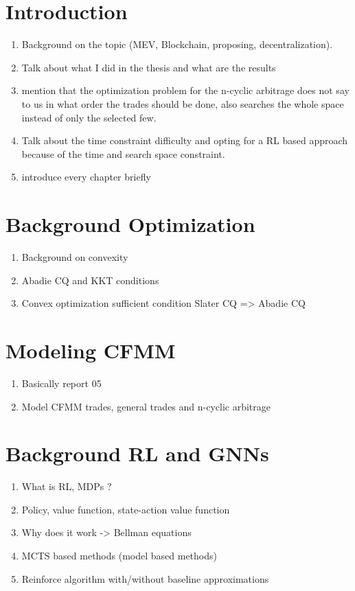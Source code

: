 


\maketitle

\tableofcontents
\section{Introduction}
\begin{enumerate}
    \item  Background on the topic (MEV, Blockchain, proposing, decentralization).
    \item Talk about what I did in the thesis and what are the results
    \item mention that the optimization problem for the n-cyclic arbitrage
        does not say to us in what order the trades should be done, also
        searches the whole space instead of only the selected few.
    \item Talk about the time constraint difficulty and opting for a RL based
        approach because of the time and search space constraint.
    \item introduce every chapter briefly
\end{enumerate}

\section{Background Optimization}
\begin{enumerate}
    \item Background on convexity
    \item Abadie CQ and KKT conditions
    \item Convex optimization sufficient condition Slater CQ => Abadie CQ
\end{enumerate}

\section{Modeling CFMM}
\begin{enumerate}
    \item Basically report 05
    \item Model CFMM trades, general trades and n-cyclic arbitrage
\end{enumerate}

\section{Background RL and GNNs}
\begin{enumerate}
    \item What is RL, MDPs ?
    \item Policy, value function, state-action value function
    \item Why does it work -> Bellman equations
    \item MCTS based methods (model based methods)
    \item Reinforce algorithm with/without baseline approximations
\end{enumerate}
